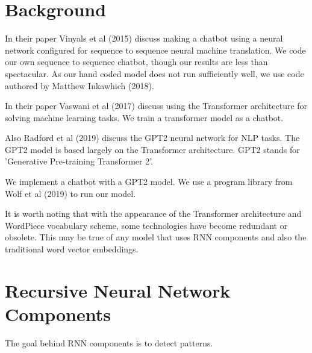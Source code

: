 

\section{Background}

In their paper Vinyals et al (2015)\cite{DBLP:journals/corr/VinyalsL15} discuss making a chatbot using
a neural network configured for sequence to sequence neural machine
translation. We code our own sequence to sequence chatbot, though our results are less than
spectacular. As our hand coded model does not run sufficiently well, we use code authored by Matthew Inkawhich (2018)\cite{2018Inkawhich}.

In their paper Vaswani et al (2017)\cite{Vaswani2017AttentionIA} discuss using the Transformer architecture for solving machine learning tasks. We train a transformer model as a chatbot.


Also Radford et al (2019)\cite{radford2019language} discuss the GPT2 neural network for NLP tasks. The GPT2 model is based largely on the Transformer architecture. GPT2 stands for 'Generative Pre-training Transformer 2'. 

We implement a chatbot with a GPT2 model. We use a program library from Wolf et al (2019)\cite{Wolf2019HuggingFacesTS} to run our model.


It is worth noting that with the appearance of the Transformer architecture and WordPiece vocabulary scheme, some technologies have become redundant or obsolete. This may be true of any model that uses RNN components and also the traditional word vector embeddings.

\section{Recursive Neural Network Components}

The goal behind RNN components is to detect patterns.

